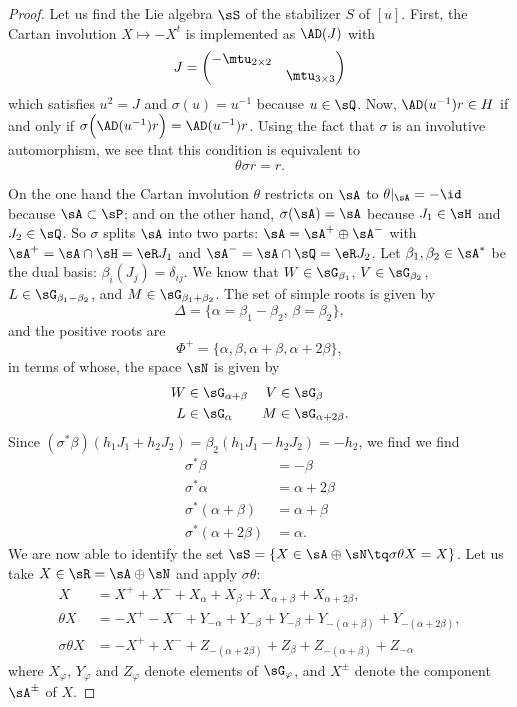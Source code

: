 \begin{proof}
	Let us find the Lie algebra $\sS$ of the stabilizer $S$ of $[u]$. First, the Cartan involution $X\mapsto -X^{t}$ is implemented as $\AD(J)$ with
	\[
		J=\begin{pmatrix}
			-\mtu_{2\times 2}   \\
			 & \mtu_{3\times 3}
		\end{pmatrix}
	\]
	which satisfies $u^{2}=J$ and $\sigma(u)=u^{-1}$ because $u\in\sQ$. Now, $\AD(u^{-1})r\in H$ if and only if $\sigma\Big( \AD(u^{-1})r \Big)=\AD(u^{-1})r$. Using the fact that $\sigma$ is an involutive automorphism, we see that this condition is equivalent to
	\begin{equation}
		\theta\sigma r=r.
	\end{equation}

	On the one hand the Cartan involution $\theta$ restricts on $\sA$ to $\theta|_{\sA}=-\id$ because $\sA\subset\sP$; and on the other hand, $\sigma(\sA)=\sA$ because $J_1\in\sH$ and $J_2\in\sQ$. So $\sigma$ splits $\sA$ into two parts:  $\sA=\sA^{+}\oplus\sA^{-}$ with $\sA^+=\sA\cap\sH=\eR J_1$ and $\sA^-=\sA\cap\sQ=\eR J_2$. Let $\beta_{1},\beta_{2}\in\sA^*$ be the dual basis: $\beta_{i}(J_{j})=\delta_{ij}$.  We know that $W\in\sG_{\beta_{1}}$, $V\in\sG_{\beta_{2}}$, $L\in\sG_{\beta_{1}-\beta_{2}}$, and $M\in\sG_{\beta_{1}+\beta_{2}}$.  The set of simple roots is given by
	\[
		\Delta=\{ \alpha=\beta_{1}-\beta_{2},\,\beta=\beta_{2} \},
	\]
	and the positive roots are
	\[
		\Phi^{+}=\{ \alpha,\beta,\alpha+\beta,\alpha+2\beta \},
	\]
	in terms of whose, the space $\sN$ is given by
	\begin{align*}
		W & \in\sG_{\alpha+\beta} & V & \in\sG_{\beta}          \\
		L & \in\sG_{\alpha}       & M & \in\sG_{\alpha+2\beta}.
	\end{align*}
	Since $(\sigma^*\beta)(h_1J_1+h_2J_2)=\beta_{2}(h_1J_1-h_2J_2)=-h_2$, we find
	we find
	\begin{align*}
		\sigma^*\beta           & =-\beta        \\
		\sigma^*\alpha          & =\alpha+2\beta \\
		\sigma^*(\alpha+\beta)  & =\alpha+\beta  \\
		\sigma^*(\alpha+2\beta) & =\alpha.
	\end{align*}
	We are now able to identify the set $\sS=\{ X\in\sA\oplus\sN\tq \sigma\theta X=X \}$. Let us take $X\in\sR=\sA\oplus\sN$ and apply $\sigma\theta$:
	\begin{equation}
		\begin{split}
			X&=X^++X^-+X_{\alpha}+X_{\beta}+X_{\alpha+\beta}+X_{\alpha+2\beta},\\
			\theta X&=-X^+-X^-+Y_{-\alpha}+Y_{-\beta}+Y_{-\beta}+Y_{-(\alpha+\beta)}+Y_{-(\alpha+2\beta)},\\
			\sigma\theta X&=-X^++X^-+Z_{-(\alpha+2\beta)}+Z_{\beta}+Z_{-(\alpha+\beta)}+Z_{-\alpha}
		\end{split}
	\end{equation}
	where $X_{\varphi}$, $Y_{\varphi}$ and $Z_{\varphi}$ denote elements of $\sG_{\varphi}$, and $X^{\pm}$ denote the component $\sA^{\pm}$ of $X$.


\end{proof}
